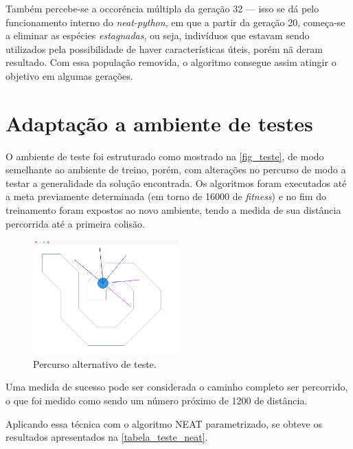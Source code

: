 Tamb{\'e}m percebe-se a occor{\'e}ncia m{\'u}ltipla da gera{\c c}{\~a}o 32 —
isso se d{\'a} pelo funcionamento interno do \textit{neat-python}, em que a
partir da gera{\c c}{\~a}o 20, come{\c c}a-se a eliminar as esp{\'e}cies
\textit{estagnadas}, ou seja, indiv{\'i}duos que estavam sendo utilizados pela
possibilidade de haver caracter{\'i}sticas {\'u}teis, por{\'e}m n{\~a} deram
resultado. Com essa popula{\c c}{\~a}o removida, o algoritmo consegue assim
atingir o objetivo em algumas gera{\c c}{\~o}es.

\section{Adapta{\c c}{\~a}o a ambiente de testes}

O ambiente de teste foi estruturado como mostrado na \autoref{fig_teste}, de
modo semelhante ao ambiente de treino, por{\'e}m, com altera{\c c}{\~o}es no
percurso de modo a testar a generalidade da solu{\c c}{\~a}o encontrada. Os
algoritmos foram executados at{\'e} a meta previamente determinada (em torno de
16000 de \textit{fitness}) e no fim do treinamento foram expostos ao novo
ambiente, tendo a medida de sua dist{\^a}ncia percorrida at{\'e} a primeira
colis{\~a}o.

\begin{figure}[htb]
        \centering
        \caption{\label{fig_teste}Percurso alternativo de teste.}
        \includegraphics[width=0.5\textwidth]{images/teste.png}
\end{figure}

Uma medida de sucesso pode ser considerada o caminho completo ser percorrido, o que foi
medido como sendo um número próximo de 1200 de dist{\^a}ncia.

Aplicando essa t{\'e}cnica com o algoritmo NEAT parametrizado, se obteve os
resultados apresentados na \autoref{tabela_teste_neat}.

